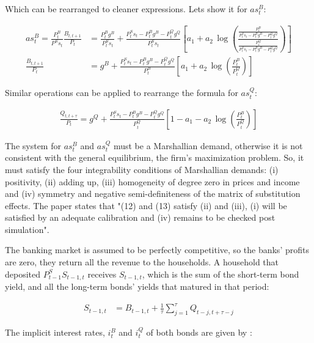 \documentclass[12pt]{article}
\begin{document}
Which can be rearranged to cleaner expressions. Lets show it for $as_{t}^{B}$:

\begin{align*}
    as_{t}^{B} = \frac{P^B_t}{P^Ss_t}\frac{B_{t,t+1}}{P_{t}} &= {\frac{P_{t}^{B}g^{B}}{P_{t}^{S}s_{t}}}+\frac{P_{t}^{S}s_{t} - P_{t}^{B}g^{B}-P_{t}^{Q}g^{Q}}{P_{t}^{S}s_{t}}\left[a_{1}+a_{2}\,\log\left(\frac{\frac{P_{t}^{B}}{P_{t}^{S}s_{t}-P_{t}^{B}g^{B}-P_{t}^{Q}g^{Q}}}{\frac{P_{t}^{Q}}{P_{t}^{S}s_{t}-P_{t}^{B}g^{B}-P_{t}^{Q}g^{Q}}}\right)\right]\\
    \frac{B_{t,t+1}}{P_{t}} &= g^{B}\!+\!\frac{P_{t}^{S}s_{t}\!-\!P_{t}^{B}g^{B}\!-\!P_{t}^{Q}g^{Q}}{P_{t}^{B}}\!\left[\!a_{1}\!+\!a_{2}\,\log\left(\!\frac{P_{t}^{B}}{P_{t}^{Q}}\right)\!\right] \tag{12}
\end{align*}

Similar operations can be applied to rearrange the formula for $as_{t}^{Q}$:

\begin{align*}
    \frac{Q_{t,t+\tau}}{P_{t}}\!=\!g^{Q}\!+\!\frac{P_{t}^{S}\!s_{t}\!-\!P_{t}^{B}\!g^{B}\!-\!P_{t}^{Q}g^{Q}}{P_{t}^{Q}}\!\left[1\!-\!a_{1}\!-\!a_{2}\,\log\left(\!\frac{P_{t}^{B}}{P_{t}^{Q}}\right)\right] \tag{13}
\end{align*}

The system for $as_{t}^{B}$ and $as_{t}^{Q}$ must be a Marshallian demand, otherwise it is not consistent with the general equilibrium, the firm's maximization problem. So, it must satisfy the four integrability conditions of Marshallian demands: (i) positivity, (ii) adding up, (iii) homogeneity of degree zero in prices and income and (iv) symmetry and negative semi-definiteness of the matrix of substitution effects. The paper states that "(12) and (13) satisfy (ii) and (iii), (i) will be satisfied by an adequate calibration and (iv) remains to be checked post simulation". %

The banking market is assumed to be perfectly competitive, so the banks' profits are zero, they return all the revenue to the households. A household that deposited $P^S_{t-1}S_{t-1,t}$ receives $S_{t-1,t}$, which is the sum of the short-term bond yield, and all the long-term bonds' yields that matured in that period:

\begin{align*}
    S_{t-1,t} &= B_{t-1,t} + \frac{1}{\tau}\sum_{j=1}^\tau Q_{t-j,t+\tau-j} \tag{14}
\end{align*}

The implicit interest rates, $i_t^B$ and $i_t^Q$ of both bonds are given by :
\end{document}
